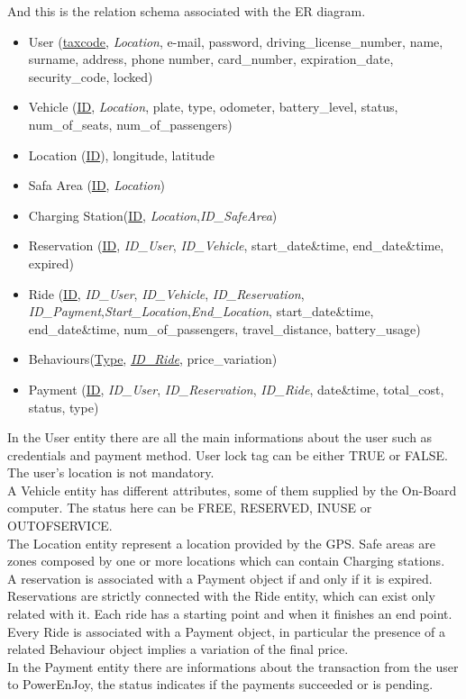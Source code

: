  And this is the relation schema associated with the ER diagram.
\begin{itemize} 
	\item{User (\underline{taxcode}, \textit{Location}, e-mail, password, driving\_license\_number, name, surname, address, phone number, card\_number, expiration\_date, security\_code, locked)}
	\item{Vehicle (\underline{ID}, \textit{Location}, plate, type, odometer, battery\_level, status, num\_of\_seats, num\_of\_passengers) }
	\item{Location (\underline{ID}), longitude, latitude}	
	\item{Safa Area (\underline{ID}, \textit{Location})} %
	\item{Charging Station(\underline{ID}, \textit{Location},\textit{ID\_SafeArea})}
	\item{Reservation (\underline{ID}, \textit{ID\_User}, \textit{ID\_Vehicle}, start\_date\&time, end\_date\&time, expired)}
	\item{Ride (\underline{ID}, \textit{ID\_User}, \textit{ID\_Vehicle}, \textit{ID\_Reservation}, \textit{ID\_Payment},\textit{Start\_Location},\textit{End\_Location}, start\_date\&time, end\_date\&time, num\_of\_passengers, travel\_distance, battery\_usage)}
	\item{Behaviours(\underline{Type}, \underline{\textit{ID\_Ride}}, price\_variation)}
	\item{Payment (\underline{ID}, \textit{ID\_User}, \textit{ID\_Reservation}, \textit{ID\_Ride}, date\&time, total\_cost, status, type)}
\end{itemize}
In the User entity there are all the main informations about the user such as credentials and payment method. User lock tag can be either TRUE or FALSE. The user's location is not mandatory.
\\A Vehicle entity has different attributes, some of them supplied by the On-Board computer. The status here can be FREE, RESERVED, INUSE or OUTOFSERVICE.
\\The Location entity represent a location provided by the GPS. Safe areas are zones composed by one or more locations which can contain Charging stations.
\\A reservation is associated with a Payment object if and only if it is expired. Reservations are strictly connected with the Ride entity, which can exist only related with it. Each ride has a starting point and when it finishes an end point. 
\\Every Ride is associated with a Payment object, in particular the presence of a related Behaviour object implies a variation of the final price. 
\\In the Payment entity there are informations about the transaction from the user to PowerEnJoy, the status indicates if the payments succeeded or is pending.
